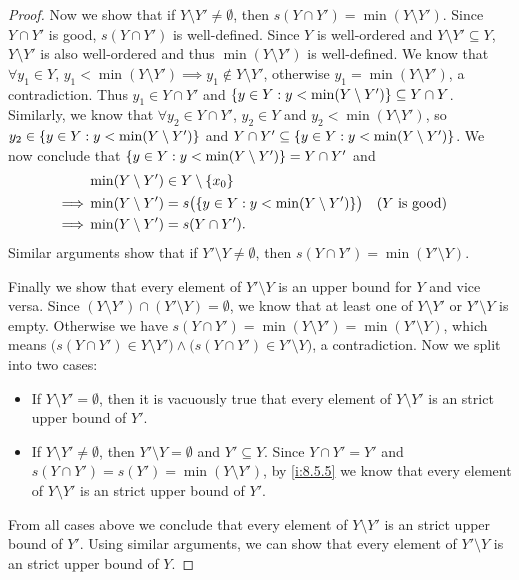 \begin{proof}
  Now we show that if \(Y \setminus Y' \neq \emptyset\), then \(s(Y \cap Y') = \min(Y \setminus Y')\).
  Since \(Y \cap Y'\) is good, \(s(Y \cap Y')\) is well-defined.
  Since \(Y\) is well-ordered and \(Y \setminus Y' \subseteq Y\), \(Y \setminus Y'\) is also well-ordered and thus \(\min(Y \setminus Y')\) is well-defined.
  We know that \(\forall y_1 \in Y\), \(y_1 < \min(Y \setminus Y') \implies y_1 \notin Y \setminus Y'\), otherwise \(y_1 = \min(Y \setminus Y')\), a contradiction.
  Thus \(y_1 \in Y \cap Y'\) and \(\left\lbrace y \in Y : y < \min(Y \setminus Y')\right\rbrace \subseteq Y \cap Y\).
  Similarly, we know that \(\forall y_2 \in Y \cap Y'\), \(y_2 \in Y\) and \(y_2 < \min(Y \setminus Y')\), so \(y_2 \in \left\lbrace y \in Y : y < \min(Y \setminus Y')\right\rbrace\) and \(Y \cap Y' \subseteq \left\lbrace y \in Y : y < \min(Y \setminus Y')\right\rbrace\).
  We now conclude that \(\left\lbrace y \in Y : y < \min(Y \setminus Y')\right\rbrace = Y \cap Y'\) and
  \begin{align*}
             & \min(Y \setminus Y') \in Y \setminus \set{x_0}                                                         \\
    \implies & \min(Y \setminus Y') = s\big(\set{y \in Y : y < \min(Y \setminus Y')}\big) &  & \text{(\(Y\) is good)} \\
    \implies & \min(Y \setminus Y') = s(Y \cap Y').
  \end{align*}
  Similar arguments show that if \(Y' \setminus Y \neq \emptyset\), then \(s(Y \cap Y') = \min(Y' \setminus Y)\).

  Finally we show that every element of \(Y' \setminus Y\) is an upper bound for \(Y\) and vice versa.
  Since \((Y \setminus Y') \cap (Y' \setminus Y) = \emptyset\), we know that at least one of \(Y \setminus Y'\) or \(Y' \setminus Y\) is empty.
  Otherwise we have \(s(Y \cap Y') = \min(Y \setminus Y') = \min(Y' \setminus Y)\), which means \(\big(s(Y \cap Y') \in Y \setminus Y'\big) \land \big(s(Y \cap Y') \in Y' \setminus Y\big)\), a contradiction.
  Now we split into two cases:
  \begin{itemize}
    \item If \(Y \setminus Y' = \emptyset\), then it is vacuously true that every element of \(Y \setminus Y'\) is an strict upper bound of \(Y'\).
    \item If \(Y \setminus Y' \neq \emptyset\), then \(Y' \setminus Y = \emptyset\) and \(Y' \subseteq Y\).
          Since \(Y \cap Y' = Y'\) and \(s(Y \cap Y') = s(Y') = \min(Y \setminus Y')\), by \cref{i:8.5.5} we know that every element of \(Y \setminus Y'\) is an strict upper bound of \(Y'\).
  \end{itemize}
  From all cases above we conclude that every element of \(Y \setminus Y'\) is an strict upper bound of \(Y'\).
  Using similar arguments, we can show that every element of \(Y' \setminus Y\) is an strict upper bound of \(Y\).
\end{proof}


